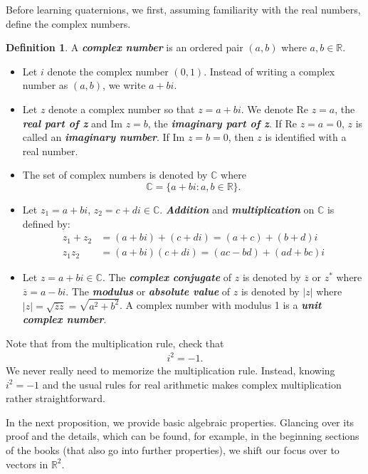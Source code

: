 \documentclass[12pt]{article}
\theoremstyle{plain}
\theoremstyle{definition}
\newtheorem{defn}[thm]{Definition}
\begin{document}
Before learning quaternions, we first, assuming familiarity with the real numbers, define the complex numbers.
\begin{defn} \label{compDefn}
A \textbf{\textit{complex number}} is an ordered pair $(a,b)$ where $a,b \in \mathbb{R}$. 
\begin{itemize}
    \item Let $i$ denote the complex number $(0,1)$. Instead of writing a complex number as $(a,b)$, we write $a+bi$.
    \item Let $z$ denote a complex number so that $z = a+bi$. We denote Re $z=a$, the \textbf{\textit{real part of z}} and Im $z=b$, the \textbf{\textit{imaginary part of z}}. If Re $z=a=0$, $z$ is called an \textbf{\textit{imaginary number}}. If Im $z=b=0$, then $z$ is identified with a real number.
    \item The set of complex numbers is denoted by $\mathbb{C}$ where
    \begin{equation*}
        \mathbb{C} = \{a+bi : a,b \in \mathbb{R} \}.
    \end{equation*}
    \item Let $z_1 = a+bi$, $z_2 = c+di\in\mathbb{C}$. \textbf{\textit{Addition}} and \textbf{\textit{multiplication}} on $\mathbb{C}$ is defined by:
    \begin{align*}
        z_1 + z_2 &= (a+bi) + (c+di) = (a+c) + (b+d)i \\
        z_1z_2 &= (a+bi)(c+di) = (ac-bd) + (ad+bc)i
    \end{align*}
    \item Let $z=a+bi\in\mathbb{C}$. The \textbf{\textit{complex conjugate}} of $z$ is denoted by $\overline{z}$ or $z^*$ where $\overline{z}=a-bi$. The \textbf{\textit{modulus}} or \textbf{\textit{absolute value}} of $z$ is denoted by $|z|$ where $|z|=\sqrt{\overline{z}z}=\sqrt{a^2+b^2}$. A complex number with modulus 1 is a \textbf{\textit{unit complex number}}. 
 \end{itemize}
\end{defn}

Note that from the multiplication rule, check that 
\begin{align*}
    i^2 = -1.
\end{align*}
We never really need to memorize the multiplication rule. Instead, knowing $i^2=-1$ and the usual rules for real arithmetic makes complex multiplication rather straightforward.

In the next proposition, we provide basic algebraic properties. Glancing over its proof and the details, which can be found, for example, in the beginning sections of the books \cite{axler, brown} (that also go into further properties), we shift our focus over to vectors in $\mathbb{R}^2$.
\end{document}
